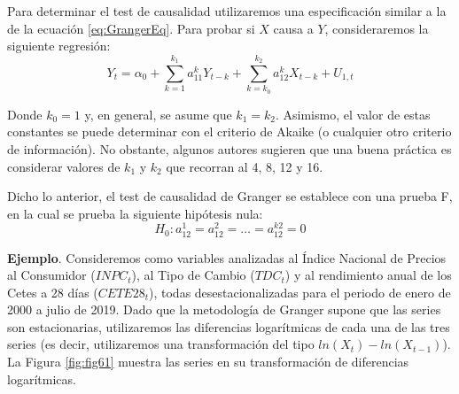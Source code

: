 \documentclass[
]{book}
\begin{document}
Para determinar el test de causalidad utilizaremos una especificación
similar a la de la ecuación \eqref{eq:GrangerEq}. Para probar si \(X\)
causa a \(Y\), consideraremos la siguiente regresión: \begin{equation}
    Y_t = \alpha_0 + \sum^{k_1}_{k = 1} a^k_{11} Y_{t-k} + \sum^{k_2}_{k = k_0} a^k_{12} X_{t-k} + U_{1,t}
\end{equation}

Donde \(k_0 = 1\) y, en general, se asume que \(k_1 = k_2\). Asimismo, el
valor de estas constantes se puede determinar con el criterio de Akaike
(o cualquier otro criterio de información). No obstante, algunos autores
sugieren que una buena práctica es considerar valores de \(k_1\) y \(k_2\)
que recorran al 4, 8, 12 y 16.

Dicho lo anterior, el test de causalidad de Granger se establece con una
prueba F, en la cual se prueba la siguiente hipótesis nula:
\begin{equation}
    H_0: a^1_{12} = a^2_{12} = \ldots = a^{k2}_{12} = 0
\end{equation}

\textbf{Ejemplo}. Consideremos como variables analizadas al Índice
Nacional de Precios al Consumidor (\(INPC_t\)), al Tipo de Cambio
(\(TDC_t\)) y al rendimiento anual de los Cetes a 28 días (\(CETE28_t\)),
todas desestacionalizadas para el periodo de enero de 2000 a julio de
2019. Dado que la metodología de Granger supone que las series son
estacionarias, utilizaremos las diferencias logarítmicas de cada una de
las tres series (es decir, utilizaremos una transformación del tipo
\(ln(X_t) - ln(X_{t-1})\)). La Figura \ref{fig:fig61} muestra las series
en su transformación de diferencias logarítmicas.
\end{document}
